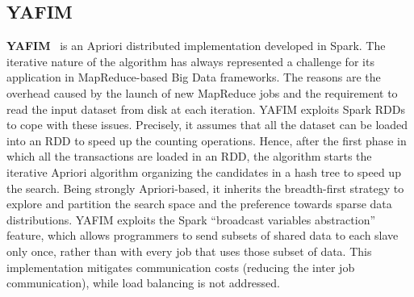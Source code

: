 \documentclass[preprint,review,12pt]{elsarticle}
\begin{document}


\subsection{YAFIM}
{\bf YAFIM}~\cite{YAFIM} is an Apriori distributed implementation developed in Spark.
The iterative nature of the algorithm has always represented a challenge for its application in MapReduce-based Big Data
frameworks. The reasons are the overhead caused by the launch of new MapReduce
jobs and the requirement to read the input dataset from disk at each
iteration. YAFIM exploits Spark RDDs to cope with these issues. Precisely, it
assumes that all the dataset can be loaded into an RDD to speed up the
counting operations. Hence, after the first phase in which all the transactions
are loaded in an RDD, the algorithm starts the iterative Apriori algorithm organizing
the candidates in a hash tree to speed up the search.
Being strongly Apriori-based, it inherits the breadth-first strategy to explore and partition
the search space and the preference towards sparse data distributions.
YAFIM exploits the Spark ``broadcast variables abstraction'' feature, which allows
programmers to send subsets of shared data to each slave only once,
rather than with every job that uses those subset of data. This
implementation mitigates communication costs (reducing the inter job
communication), while load balancing is not addressed.
\end{document}
